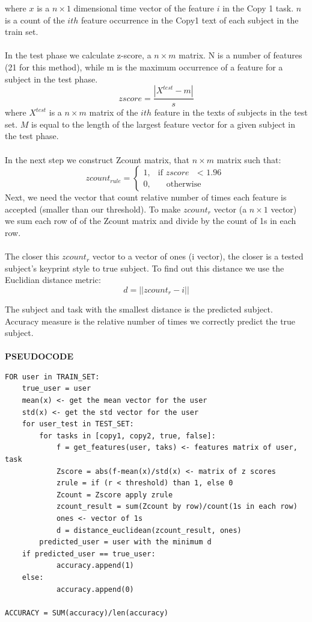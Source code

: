 \documentclass[12pt,a4]{article}
\begin{document}
where $x$ is a $n\times 1$ dimensional time vector of the feature $i$ in the Copy 1 task. $n$ is a count of the $ith$ feature occurrence in the Copy1 text of each subject in the train set.\\
\\
In the test phase we calculate z-score, a $n \times m$ matrix. N is a number of features (21 for this method), while m is the maximum occurrence of a feature for a subject in the test phase.
$$
zscore = \frac{|X^{test} - m|}{s}
$$
where $X^{test}$ is a $n\times m$ matrix of the $ith$ feature in the texts of subjects in the test set. $M$ is equal to the length of the largest feature vector for a given subject in the test phase. \\
\\
In the next step we construct Zcount matrix, that $n \times m$ matrix such that:
$$
zcount_{rule} = \begin{cases} 1, & \mbox{if } zscore \mbox{ $<$ 1.96} \\ 0, & \mbox{ } \mbox{ otherwise} \end{cases}
$$
Next, we need the vector that count relative number of times each feature is accepted (smaller than our threshold). To make $zcount_r$ vector (a $n \times 1$ vector) we sum each row of of the Zcount matrix and divide by the count of 1s in each row.
\\
\\
The closer this $zcount_r$ vector to a vector of ones (i vector), the closer is a tested subject's keyprint style to true subject. To find out this distance we use the Euclidian distance metric:
$$
d = ||zcount_r - i||
$$

The subject and task with the smallest distance is the predicted subject. Accuracy measure is the relative number of times we correctly predict the true subject.\\
\\
\small\textbf{PSEUDOCODE}

\normalsize

\begin{lstlisting}
FOR user in TRAIN_SET:
    true_user = user
    mean(x) <- get the mean vector for the user
    std(x) <- get the std vector for the user
    for user_test in TEST_SET:
        for tasks in [copy1, copy2, true, false]:
            f = get_features(user, taks) <- features matrix of user, task
            Zscore = abs(f-mean(x)/std(x) <- matrix of z scores
            zrule = if (r < threshold) than 1, else 0
            Zcount = Zscore apply zrule
            zcount_result = sum(Zcount by row)/count(1s in each row)
            ones <- vector of 1s
            d = distance_euclidean(zcount_result, ones)
        predicted_user = user with the minimum d
    if predicted_user == true_user:
            accuracy.append(1)
    else:
            accuracy.append(0)

ACCURACY = SUM(accuracy)/len(accuracy)

\end{lstlisting}
\end{document}
